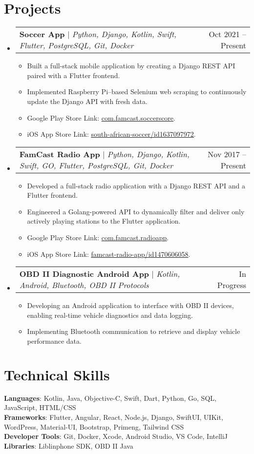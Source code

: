 \documentclass[letterpaper,11pt]{article}
\makeatletter
\newcommand{\resumeItem}[1]{
  \item\small{
    {#1 \vspace{-2pt}}
  }
}
\newcommand{\resumeProjectHeading}[2]{
    \item
    \begin{tabular*}{0.97\textwidth}{l@{\extracolsep{\fill}}r}
      \small#1 & #2 \\
    \end{tabular*}\vspace{-7pt}
}
\newcommand{\resumeSubHeadingListStart}{\begin{itemize}[leftmargin=0.15in, label={}]}
\newcommand{\resumeSubHeadingListEnd}{\end{itemize}}
\newcommand{\resumeItemListStart}{\begin{itemize}}
\newcommand{\resumeItemListEnd}{\end{itemize}\vspace{-5pt}}
\makeatother
\begin{document}
\section{Projects}
    \resumeSubHeadingListStart
      \resumeProjectHeading
          {\textbf{Soccer App} $|$ \emph{Python, Django, Kotlin, Swift, Flutter, PostgreSQL, Git, Docker}}{Oct 2021 -- Present}
          \resumeItemListStart
            \resumeItem{Built a full-stack mobile application by creating a Django REST API paired with a Flutter frontend.}
            \resumeItem{Implemented Raspberry Pi–based Selenium web scraping to continuously update the Django API with fresh data.}
            \resumeItem{Google Play Store Link: \href{https://play.google.com/store/apps/details?id=com.famcast.soccerscore}{\underline{com.famcast.soccerscore}}.}
            \resumeItem{iOS App Store Link: \href{https://apps.apple.com/us/app/south-african-soccer/id1637097972}{\underline{south-african-soccer/id1637097972}}.}
          \resumeItemListEnd
      \resumeProjectHeading
          {\textbf{FamCast Radio App} $|$ \emph{Python, Django, Kotlin, Swift, GO, Flutter, PostgreSQL, Git, Docker}}{Nov 2017 -- Present}
          \resumeItemListStart
            \resumeItem{Developed a full-stack radio application with a Django REST API and a Flutter frontend.}
            \resumeItem{Engineered a Golang-powered API to dynamically filter and deliver only actively playing stations to the Flutter application.}
            \resumeItem{Google Play Store Link: \href{https://play.google.com/store/apps/details?id=com.famcast.radioapp}{\underline{com.famcast.radioapp}}.}
            \resumeItem{iOS App Store Link: \href{https://apps.apple.com/us/app/famcast-radio-app/id1470606058}{\underline{famcast-radio-app/id1470606058}}.}
          \resumeItemListEnd
        \resumeProjectHeading
            {\textbf{OBD II Diagnostic Android App} $|$ \emph{Kotlin, Android, Bluetooth, OBD II Protocols}}{In Progress}
            \resumeItemListStart
                \resumeItem{Developing an Android application to interface with OBD II devices, enabling real-time vehicle diagnostics and data logging.}
                \resumeItem{Implementing Bluetooth communication to retrieve and display vehicle performance data.}
    \resumeItemListEnd
    \resumeSubHeadingListEnd

%
\section{Technical Skills}
 \begin{itemize}[leftmargin=0.15in, label={}]
    \small{\item{
     \textbf{Languages}{: Kotlin, Java, Objective-C, Swift, Dart, Python, Go, SQL, JavaScript, HTML/CSS} \\
     \textbf{Frameworks}{: Flutter, Angular, React, Node.js, Django, SwiftUI, UIKit, WordPress, Material-UI, Bootstrap, Primeng, Tailwind CSS} \\
     \textbf{Developer Tools}{: Git, Docker, Xcode, Android Studio, VS Code,  IntelliJ} \\
     \textbf{Libraries}{: Liblinphone SDK, OBD II Java}
    }}
 \end{itemize}
\end{document}
